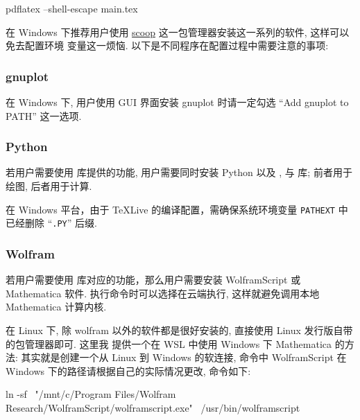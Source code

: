 \documentclass[
  hyper, lang=cn, 
  class=l3dox, 
]{../../zlatex/code/ztex}
\begin{document}
\begin{DocExample}
  pdflatex --shell-escape main.tex
\end{DocExample}

在 Windows 下推荐用户使用 \href{https://scoop.sh/}{scoop} 这一包管理器安装这一系列的软件, 这样可以免去配置环境
变量这一烦恼. 以下是不同程序在配置过程中需要注意的事项:

\vspace*{-.5em}
\subsubsection{gnuplot}
在 Windows 下, 用户使用 GUI 界面安装 gnuplot 时请一定勾选 ``Add gnuplot to PATH'' 这一选项.

\vspace*{-.5em}
\subsubsection{Python}
若用户需要使用  库提供的功能, 用户需要同时安装 Python 以及 , 
 与  库; 前者用于绘图, 后者用于计算.

在 Windows 平台，由于 \TeX{}Live 的编译配置，需确保系统环境变量 \texttt{PATHEXT} 中已经删除 ``\texttt{.PY}'' 后缀. 

\vspace*{-.5em}
\subsubsection{Wolfram}
若用户需要使用  库对应的功能，那么用户需要安装 WolframScript 或
Mathematica 软件. 执行命令时可以选择在云端执行, 这样就避免调用本地 Mathematica 计算内核. 

在 Linux 下, 除 wolfram 以外的软件都是很好安装的, 直接使用 Linux 发行版自带的包管理器即可. 这里我
提供一个在 WSL 中使用 Windows 下 Mathematica 的方法: 其实就是创建一个从 Linux 到 Windows 的软连接,
命令中 WolframScript 在 Windows 下的路径请根据自己的实际情况更改, 命令如下:

\begin{DocExample}[@@]
ln -sf \
  "/mnt/c/Program Files/Wolfram Research/WolframScript/wolframscript.exe" \
  /usr/bin/wolframscript  
\end{DocExample}
\end{document}
